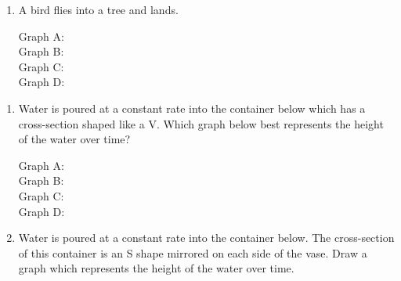 \documentclass[nooutcomes,noauthor,handout]{ximera}
\begin{document}
\begin{problem}
\begin{enumerate}
\item A bird flies into a tree and lands.

Graph A:  \\
Graph B:  \\
Graph C:  \\
Graph D:  \\



\end{enumerate}

\end{problem}

\newpage

\begin{problem}
\begin{enumerate}
\item Water is poured at a constant rate into the container below which has a cross-section shaped like a V. Which graph below best represents the height of the water over time?

\begin{image}
\end{image}

Graph A:  \\
Graph B:  \\
Graph C:  \\
Graph D:  \\

\item Water is poured at a constant rate into the container below. The cross-section of this container is an S shape mirrored on each side of the vase. Draw a graph which represents the height of the water over time.

\begin{image}
\end{image}
\end{enumerate}
\end{problem}
\end{document}
